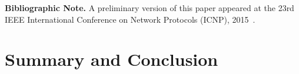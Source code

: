 \documentclass[preprint,12pt]{elsarticle}
\newcommand{\CC}{\textsc{NI}}
\newcommand{\FP}{\textsc{FP}}
\newcommand{\RS}{\textsc{RS}}
\newcommand{\BW}{\textsc{BW}}
\newcommand{\MA}{\textsc{MA}}
\begin{document}
\noindent \textbf{Bibliographic Note.} A preliminary version of this paper appeared
at the 23rd IEEE International Conference on Network Protocols (ICNP), 2015~\cite{icnp15loc}.

\section{Summary and Conclusion}\label{sec:conclusion}

\end{document}
